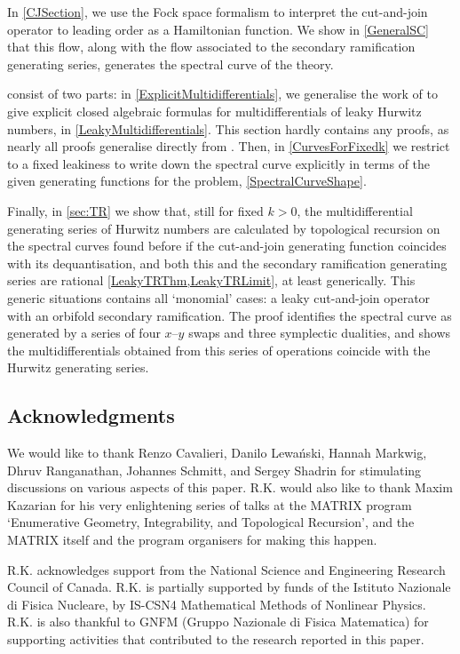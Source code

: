 \documentclass[10pt,a4paper,oneside,no-math,reqno]{amsart}%
\theoremstyle{plain}
\theoremstyle{definition}
\theoremstyle{remark}
\numberwithin{equation}{section}
\newcommand{\1}{\mathds{1}}
\newcommand{\<}{\langle}
\renewcommand{\>}{\rangle}
\begin{document}
In \cref{CJSection}, we use the Fock space formalism to interpret the cut-and-join operator to leading order as a Hamiltonian function. We show in \cref{GeneralSC} that this flow, along with the flow associated to the secondary ramification generating series, generates the spectral curve of the theory.

 consist of two parts: in \cref{ExplicitMultidifferentials}, we generalise the work of \cite{BDKS22} to give explicit closed algebraic formulas for multidifferentials of leaky Hurwitz numbers, in \cref{LeakyMultidifferentials}. This section hardly contains any proofs, as nearly all proofs generalise directly from \cite{BDKS22}. Then, in \cref{CurvesForFixedk} we restrict to a fixed leakiness to write down the spectral curve explicitly in terms of the given generating functions for the problem, \cref{SpectralCurveShape}.

Finally, in \cref{sec:TR} we show that, still for fixed $k >0$, the multidifferential generating series of Hurwitz numbers are calculated by topological recursion on the spectral curves found before if the cut-and-join generating function coincides with its dequantisation, and both this and the secondary ramification generating series are rational \cref{LeakyTRThm,LeakyTRLimit}, at least generically. This generic situations contains all `monomial' cases: a leaky cut-and-join operator with an orbifold secondary ramification.
The proof identifies the spectral curve as generated by a series of four $ x$--$y$ swaps and three symplectic dualities, and shows the multidifferentials obtained from this series of operations coincide with the Hurwitz generating series.

\subsection{Acknowledgments}

We would like to thank Renzo Cavalieri, Danilo Lewański, Hannah Markwig, Dhruv Ranganathan, Johannes Schmitt, and Sergey Shadrin for stimulating discussions on various aspects of this paper. R.K. would also like to thank Maxim Kazarian for his very enlightening series of talks at the MATRIX program `Enumerative Geometry, Integrability, and Topological Recursion', and the MATRIX itself and the program organisers for making this happen.

R.K. acknowledges support from the National Science and Engineering Research Council of Canada. R.K. is partially supported by funds of the Istituto Nazionale di Fisica Nucleare, by IS-CSN4 Mathematical Methods of Nonlinear Physics. R.K. is also thankful to GNFM (Gruppo Nazionale di Fisica Matematica) for supporting activities that contributed to the research reported in this paper.
\end{document}
